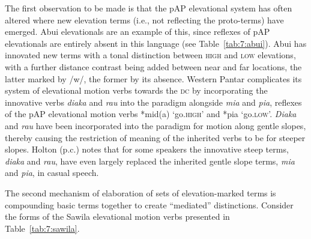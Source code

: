 The first observation to be made is that the pAP elevational system has often altered where new elevation terms (i.e., not reflecting the proto-terms) have emerged. Abui elevationals are an example of this, since reflexes of pAP elevationals are entirely absent in this language (see Table~\ref{tab:7:abui}). Abui has innovated new terms with a tonal distinction between \textsc{high} and \textsc{low} elevations, with a further distance contrast being added between near and far locations, the latter marked by /w/, the former by its absence. Western Pantar complicates its system of elevational motion verbs towards the \textsc{dc} by incorporating the innovative verbs \textit{diaka{\ng}} and \textit{rau{\ng}} into the paradigm alongside \textit{mia} and \textit{pia}, reflexes of the pAP elevational motion verbs *mid(a) `go.\textsc{high'} and *pia `go.\textsc{low'.} \textit{Diaka{\ng}} and \textit{rau{\ng}} have been incorporated into the paradigm for motion along gentle slopes, thereby causing the restriction of meaning of the inherited verbs to be for steeper slopes. Holton (p.c.) notes that for some speakers the innovative steep terms, \textit{diaka{\ng}} and \textit{rau{\ng}}, have even largely replaced the inherited gentle slope terms, \textit{mia} and \textit{pia}, in casual speech. 

The second mechanism of elaboration of sets of elevation-marked terms is compounding basic terms together to create ``mediated'' distinctions. Consider the forms of the Sawila elevational motion verbs presented in Table~\ref{tab:7:sawila}. 

 


